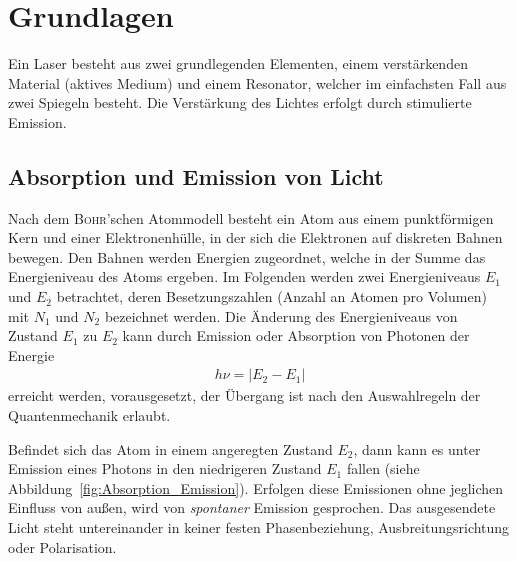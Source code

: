 \documentclass[a4paper,twoside,final]{article}
\begin{document}
\newpage
\section{Grundlagen} \label{sec:Grundlagen}
Ein Laser besteht aus zwei grundlegenden Elementen, einem verstärkenden Material (aktives Medium) und einem Resonator, welcher im einfachsten Fall aus zwei Spiegeln besteht. Die Verstärkung des Lichtes erfolgt durch stimulierte Emission.

\subsection{Absorption und Emission von Licht}
Nach dem \textsc{Bohr}'schen Atommodell besteht ein Atom aus einem punktförmigen Kern und einer Elektronenhülle, in der sich die Elektronen auf diskreten Bahnen bewegen. Den Bahnen werden Energien zugeordnet, welche in der Summe das Energieniveau des Atoms ergeben. Im Folgenden werden zwei Energieniveaus $E_1$ und $E_2$ betrachtet, deren Besetzungszahlen (Anzahl an Atomen pro Volumen) mit $N_1$ und $N_2$ bezeichnet werden. Die Änderung des Energieniveaus von Zustand $E_1$ zu $E_2$ kann durch Emission oder Absorption von Photonen der Energie
\begin{align}
  h\nu = |E_2 - E_1|
\end{align}
erreicht werden, vorausgesetzt, der Übergang ist nach den Auswahlregeln der Quantenmechanik erlaubt.



Befindet sich das Atom in einem angeregten Zustand $E_2$, dann kann es unter Emission eines Photons in den niedrigeren Zustand $E_1$ fallen (siehe Abbildung~\ref{fig:Absorption_Emission}). Erfolgen diese Emissionen ohne jeglichen Einfluss von außen, wird von \emph{spontaner} Emission gesprochen. Das ausgesendete Licht steht untereinander in keiner festen Phasenbeziehung, Ausbreitungsrichtung oder Polarisation.
\end{document}
